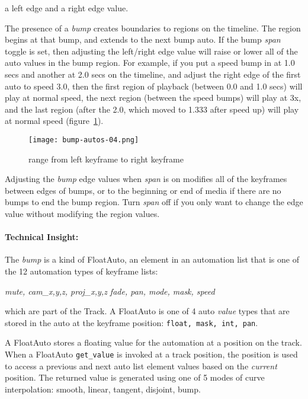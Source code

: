    a left edge and a right edge value.

The presence of a \textit{bump} creates boundaries
to regions on the timeline.  The region begins at that bump, and extends to
the next bump auto.  If the bump \textit{span} toggle is set, then adjusting the
left/right edge value will raise or lower all of the auto values in the
bump region.  For example, if you put a speed bump in at 1.0 secs and
another at 2.0 secs on the timeline, and adjust the right edge of the first auto to
speed 3.0, then the first region of playback (between 0.0 and 1.0 secs) will
play at normal speed, the next region (between the speed bumps) will play
at 3x, and the last region (after the 2.0, which moved to 1.333 after speed up)
will play at normal speed (figure~\ref{fig:bump-autos-04}).

\begin{figure}[htpb]
	\centering
	\texttt{[image: bump-autos-04.png]}
	\caption{range from left keyframe to right keyframe}
	\label{fig:bump-autos-04}
\end{figure}

Adjusting the \textit{bump} edge values when \textit{span} is on modifies all of the keyframes between edges of bumps, or to the beginning or end of media if there are no bumps to end the bump region.  Turn \textit{span} off if you only want to change the edge value without modifying the region values.

\paragraph{Technical Insight:} The \textit{bump} is a kind of FloatAuto, an element in an automation list that is one of the 12 automation types of keyframe lists:

\qquad \textit{mute, cam\_x,y,z, proj\_x,y,z fade, pan, mode, mask, speed}

which are part of the Track.  A FloatAuto is one of 4 auto \textit{value} types
that are stored in the auto at the keyframe position: \texttt{float, mask, int,
pan}.

A FloatAuto stores a floating value for the automation at a position on
the track.  When a FloatAuto \texttt{get\_value} is invoked at a track position, the
position is used to access a previous and next auto list element values
based on the \textit{current} position.  The returned value is generated using
one of 5 modes of curve interpolation: smooth, linear, tangent, disjoint, bump.

